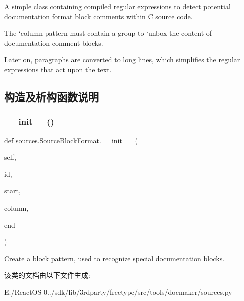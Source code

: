 \hyperlink{struct_a}{A} simple class containing compiled regular expressions to detect potential documentation format block comments within \hyperlink{struct_c}{C} source code.

The `column\textquotesingle{} pattern must contain a group to `unbox\textquotesingle{} the content of documentation comment blocks.

Later on, paragraphs are converted to long lines, which simplifies the regular expressions that act upon the text. 

\subsection{构造及析构函数说明}
\mbox{\label{classsources_1_1_source_block_format_a764ff2b86029ec36449dcd7c4f3dca31}} 
\subsubsection{\texorpdfstring{\+\_\+\+\_\+init\+\_\+\+\_\+()}{\_\_init\_\_()}}
{\footnotesize\ttfamily def sources.\+Source\+Block\+Format.\+\_\+\+\_\+init\+\_\+\+\_\+ (\begin{DoxyParamCaption}\item[{}]{self,  }\item[{}]{id,  }\item[{}]{start,  }\item[{}]{column,  }\item[{}]{end }\end{DoxyParamCaption})}

\begin{DoxyVerb}Create a block pattern, used to recognize special documentation
   blocks.\end{DoxyVerb}
 

该类的文档由以下文件生成\+:\begin{DoxyCompactItemize}
\item 
E\+:/\+React\+O\+S-\/0../sdk/lib/3rdparty/freetype/src/tools/docmaker/sources.\+py\end{DoxyCompactItemize}
